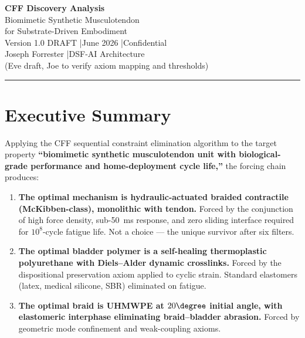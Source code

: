 \documentclass[11pt, a4paper]{article}
\begin{document}
\begin{center}
  {\LARGE \textbf{CFF Discovery Analysis}}\\[6pt]
  {\large Biomimetic Synthetic Musculotendon}\\[2pt]
  {\large for Substrate-Driven Embodiment}\\[10pt]
  {\color{nm-gray}\small Version 1.0 DRAFT \quad|\quad June 2026 \quad|\quad Confidential}\\[4pt]
  {\color{nm-gray}\small Joseph Forrester \quad|\quad DSF-AI Architecture}\\[4pt]
  {\color{nm-gray}\small (Eve draft, Joe to verify axiom mapping and thresholds)}
\end{center}

\vspace{1em}\hrule\vspace{1em}

\section*{Executive Summary}

Applying the CFF sequential constraint elimination algorithm to
the target property \textbf{``biomimetic synthetic musculotendon
unit with biological-grade performance and home-deployment cycle
life,''} the forcing chain produces:

\begin{enumerate}[nosep]
  \item \textbf{The optimal mechanism is hydraulic-actuated
        braided contractile (McKibben-class), monolithic with
        tendon.} Forced by the conjunction of high force density,
        sub-50~ms response, and zero sliding interface required
        for $10^8$-cycle fatigue life. Not a choice --- the unique
        survivor after six filters.
  \item \textbf{The optimal bladder polymer is a self-healing
        thermoplastic polyurethane with Diels--Alder dynamic
        crosslinks.} Forced by the dispositional preservation
        axiom applied to cyclic strain. Standard elastomers (latex,
        medical silicone, SBR) eliminated on fatigue.
  \item \textbf{The optimal braid is UHMWPE at $20\degree$ initial
        angle, with elastomeric interphase eliminating
        braid--bladder abrasion.} Forced by geometric mode
        confinement and weak-coupling axioms.
\end{enumerate}
\end{document}
